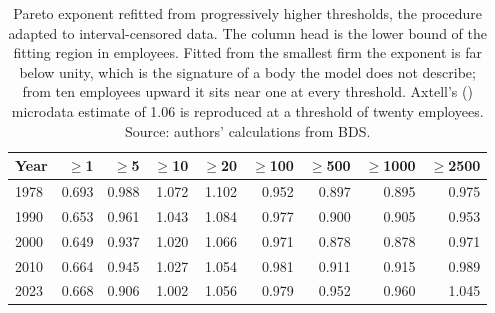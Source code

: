 \begin{table}[H]
\caption{Pareto exponent refitted from progressively higher thresholds, the
\citet{ClausetShaliziNewman2009} procedure adapted to interval-censored data. The column
head is the lower bound of the fitting region in employees. Fitted from the smallest firm
the exponent is far below unity, which is the signature of a body the model does not
describe; from ten employees upward it sits near one at every threshold. Axtell's
(\citeyear{Axtell2001}) microdata estimate of 1.06 is reproduced at a threshold of twenty
employees. Source: authors' calculations from BDS.}
\label{tab:thresholds}
\begin{tabular}{lrrrrrrrr}
\toprule
Year & $\geq$1 & $\geq$5 & $\geq$10 & $\geq$20 & $\geq$100 & $\geq$500 & $\geq$1000 & $\geq$2500 \\
\midrule
1978 & 0.693 & 0.988 & 1.072 & 1.102 & 0.952 & 0.897 & 0.895 & 0.975 \\
1990 & 0.653 & 0.961 & 1.043 & 1.084 & 0.977 & 0.900 & 0.905 & 0.953 \\
2000 & 0.649 & 0.937 & 1.020 & 1.066 & 0.971 & 0.878 & 0.878 & 0.971 \\
2010 & 0.664 & 0.945 & 1.027 & 1.054 & 0.981 & 0.911 & 0.915 & 0.989 \\
2023 & 0.668 & 0.906 & 1.002 & 1.056 & 0.979 & 0.952 & 0.960 & 1.045 \\
\bottomrule
\end{tabular}
\end{table}
